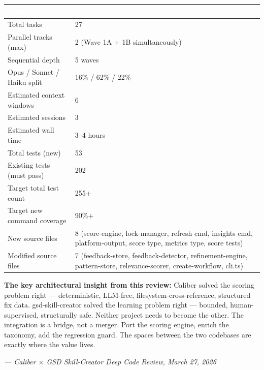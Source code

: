 \documentclass[11pt,letterpaper]{article}
\newcommand{\tableheader}[1]{\textbf{\sffamily\textcolor{white}{#1}}}
\begin{document}
\begin{center}
\begin{tabularx}{\textwidth}{L{5cm}X}
\toprule
{}
\tableheader{Metric} & \tableheader{Value} \\
\midrule
Total tasks & 27 \\
Parallel tracks (max) & 2 (Wave 1A + 1B simultaneously) \\
Sequential depth & 5 waves \\
Opus / Sonnet / Haiku split & 16\% / 62\% / 22\% \\
Estimated context windows & 6 \\
Estimated sessions & 3 \\
Estimated wall time & 3--4 hours \\
Total tests (new) & 53 \\
Existing tests (must pass) & 202 \\
Target total test count & 255+ \\
Target new command coverage & 90\%+ \\
New source files & 8 (score-engine, lock-manager, refresh cmd, insights cmd, platform-output, score type, metrics type, score tests) \\
Modified source files & 7 (feedback-store, feedback-detector, refinement-engine, pattern-store, relevance-scorer, create-workflow, cli.ts) \\
\bottomrule
\end{tabularx}
\end{center}

\vspace{1em}

\begin{quotebox}
\textbf{\sffamily The key architectural insight from this review:} Caliber solved the scoring problem right — deterministic, LLM-free, filesystem-cross-reference, structured fix data. gsd-skill-creator solved the learning problem right — bounded, human-supervised, structurally safe. Neither project needs to become the other. The integration is a bridge, not a merger. Port the scoring engine, enrich the taxonomy, add the regression guard. The spaces between the two codebases are exactly where the value lives.

\vspace{0.5em}
\textit{--- Caliber $\times$ GSD Skill-Creator Deep Code Review, March 27, 2026}
\end{quotebox}
\end{document}
